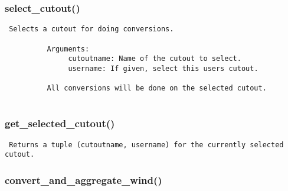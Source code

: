 \subsubsection{select\_cutout()}


\begin{verbatim}
 Selects a cutout for doing conversions.

          Arguments:
               cutoutname: Name of the cutout to select.
               username: If given, select this users cutout.

          All conversions will be done on the selected cutout.
          
\end{verbatim}
\subsubsection{get\_selected\_cutout()}


\begin{verbatim}
 Returns a tuple (cutoutname, username) for the currently selected cutout. 
\end{verbatim}
\subsubsection{convert\_and\_aggregate\_wind()}


